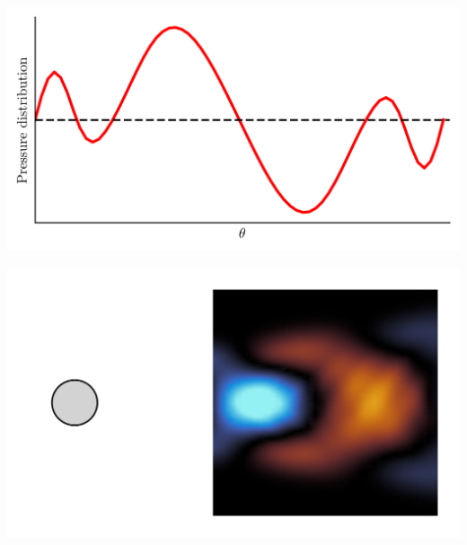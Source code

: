 \documentclass[aspectratio=169, usenames, dvipsnames]{beamer}
\begin{document}
{\begin{frame}
  \begin{minipage}{.48\textwidth}
    \includegraphics[width=\textwidth]{pressure_distribution_cca_2}
  \end{minipage}%
  \hfill
  \begin{minipage}{.48\textwidth}
    \includegraphics[width=\textwidth]{vorticity_distribution_cca_2}
  \end{minipage}
  
  \vfill
\end{frame}


\begin{frame}
  \vfill
  

\end{frame}}
\end{document}
